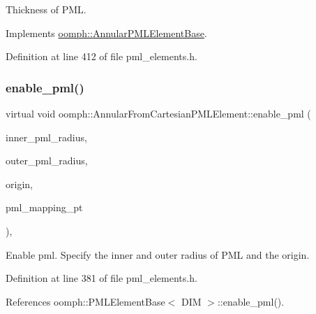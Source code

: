 Thickness of P\+ML. 



Implements \hyperlink{classoomph_1_1AnnularPMLElementBase_ad76f02aa6eb19a5757e7d4cc26ec45fa}{oomph\+::\+Annular\+P\+M\+L\+Element\+Base}.



Definition at line 412 of file pml\+\_\+elements.\+h.

\mbox{\label{classoomph_1_1AnnularFromCartesianPMLElement_ad5ac4bafd6684b1cff949e74493aff83}} 
\subsubsection{\texorpdfstring{enable\+\_\+pml()}{enable\_pml()}}
{\footnotesize\ttfamily virtual void oomph\+::\+Annular\+From\+Cartesian\+P\+M\+L\+Element\+::enable\+\_\+pml (\begin{DoxyParamCaption}\item[{const double \&}]{inner\+\_\+pml\+\_\+radius,  }\item[{const double \&}]{outer\+\_\+pml\+\_\+radius,  }\item[{const \hyperlink{classoomph_1_1Vector}{Vector}$<$ double $>$ \&}]{origin,  }\item[{\hyperlink{classoomph_1_1UniaxialPMLMapping}{Uniaxial\+P\+M\+L\+Mapping} $\ast$}]{pml\+\_\+mapping\+\_\+pt }\end{DoxyParamCaption})\hspace{0.3cm}{\ttfamily [inline]}, {\ttfamily [virtual]}}



Enable pml. Specify the inner and outer radius of P\+ML and the origin. 



Definition at line 381 of file pml\+\_\+elements.\+h.



References oomph\+::\+P\+M\+L\+Element\+Base$<$ D\+I\+M $>$\+::enable\+\_\+pml().

\mbox{\label{classoomph_1_1AnnularFromCartesianPMLElement_acac12e9f2f6df3e9edebb7747ce4fab8}} 
